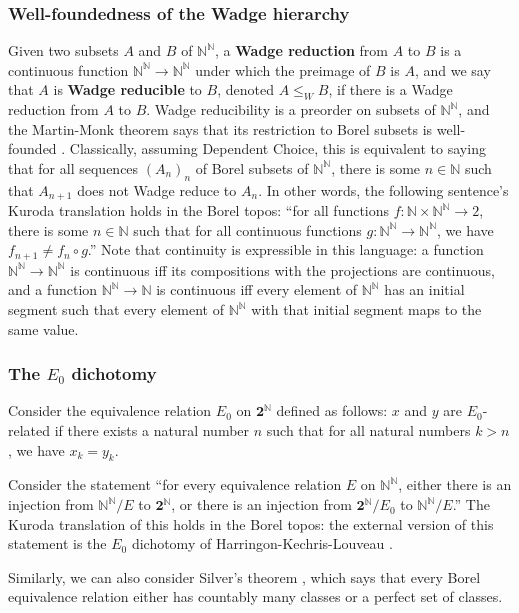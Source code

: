 \documentclass[11pt]{amsart}
\newcommand{\N}{\mathbb{N}}
\newcommand\two{\mathbf{2}}
\theoremstyle{definition}
\theoremstyle{remark}
\theoremstyle{plain}
\begin{document}
\subsubsection{Well-foundedness of the Wadge hierarchy}
Given two subsets $A$ and $B$ of $\N^\N$,
a \textbf{Wadge reduction} from $A$ to $B$
is a continuous function $\N^\N \to \N^\N$
under which the preimage of $B$ is $A$,
and we say that $A$ is \textbf{Wadge reducible} to $B$,
denoted $A \le_W B$,
if there is a Wadge reduction from $A$ to $B$.
Wadge reducibility is a preorder on subsets of $\N^\N$,
and the Martin-Monk theorem says that its restriction to Borel subsets is well-founded
\cite[Theorem~21.15]{kechris-classical}.
Classically,
assuming Dependent Choice,
this is equivalent to saying that for all sequences $(A_n)_n$ of Borel subsets of $\N^\N$,
there is some $n \in \N$ such that $A_{n+1}$ does not Wadge reduce to $A_n$.
In other words,
the following sentence's Kuroda translation holds in the Borel topos:
``for all functions $f : \N \times \N^\N \to 2$,
there is some $n \in \N$ such that for all continuous functions $g : \N^\N \to \N^\N$,
we have $f_{n+1} \neq f_n \circ g$.''
Note that continuity is expressible in this language:
a function $\N^\N \to \N^\N$ is continuous
iff its compositions with the projections are continuous,
and a function $\N^\N \to \N$ is continuous
iff every element of $\N^\N$ has an initial segment
such that every element of $\N^\N$ with that initial segment maps to the same value.

\subsubsection{The $E_0$ dichotomy}
Consider the equivalence relation $E_0$ on $\two^\N$ defined as follows:
$x$ and $y$ are $E_0$-related if there exists a natural number $n$
such that for all natural numbers $k > n$,
we have $x_k = y_k$.

Consider the statement
``for every equivalence relation $E$ on $\N^\N$,
either there is an injection from $\N^\N/E$ to $\two^\N$,
or there is an injection from $\two^\N/E_0$ to $\N^\N/E$.''
The Kuroda translation of this holds in the Borel topos:
the external version of this statement is the $E_0$ dichotomy
of Harringon-Kechris-Louveau
\cite{HKL90}.

Similarly,
    we can also consider Silver's theorem \cite[Theorem~35.20]{kechris-classical},
which says that every Borel equivalence relation
either has countably many classes
or a perfect set of classes.
\end{document}

